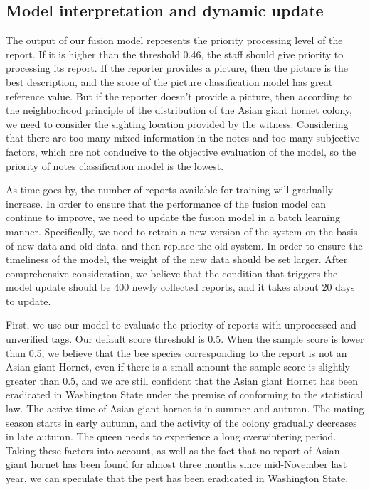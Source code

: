 \documentclass{mcmthesis}
\numberwithin{figure}{section}
\numberwithin{table}{section}
\begin{document}
\subsection{Model interpretation and dynamic update}

The output of our fusion model represents the priority processing level of the report. If it is higher than the threshold 0.46, the staff should give priority to processing its report. If the reporter provides a picture, then the picture is the best description, and the score of the picture classification model has great reference value. But if the reporter doesn't provide a picture, then according to the neighborhood principle of the distribution of the Asian giant hornet colony, we need to consider the sighting location provided by the witness. Considering that there are too many mixed information in the notes and too many subjective factors, which are not conducive to the objective evaluation of the model, so the priority of notes classification model is the lowest.

As time goes by, the number of reports available for training will gradually increase. In order to ensure that the performance of the fusion model can continue to improve, we need to update the fusion model in a batch learning manner. Specifically, we need to retrain a new version of the system on the basis of new data and old data, and then replace the old system. In order to ensure the timeliness of the model, the weight of the new data should be set larger. After comprehensive consideration, we believe that the condition that triggers the model update should be 400 newly collected reports, and it takes about 20 days to update.

First, we use our model to evaluate the priority of reports with unprocessed and unverified tags. Our default score threshold is 0.5. When the sample score is lower than 0.5, we believe that the bee species corresponding to the report is not an Asian giant Hornet, even if there is a small amount the sample score is slightly greater than 0.5, and we are still confident that the Asian giant Hornet has been eradicated in Washington State under the premise of conforming to the statistical law. The active time of Asian giant hornet is in summer and autumn. The mating season starts in early autumn, and the activity of the colony gradually decreases in late autumn. The queen needs to experience a long overwintering period. Taking these factors into account, as well as the fact that no report of Asian giant hornet has been found for almost three months since mid-November last year, we can speculate that the pest has been eradicated in Washington State.
\end{document}
